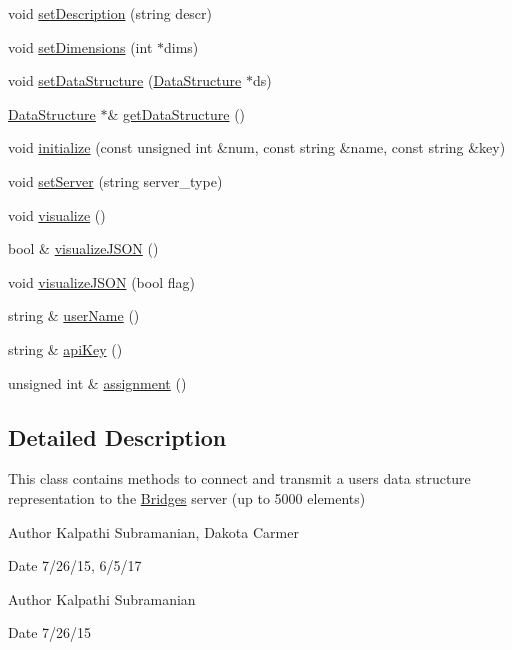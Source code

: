 \begin{DoxyCompactItemize}
void \hyperlink{namespacebridges_1_1_bridges_ada1bced1a3d7af3b8b139bbdfba72fc8}{set\+Description} (string descr)
\item 
void \hyperlink{namespacebridges_1_1_bridges_a0c04930dee803801d3a26c6ef70183f2}{set\+Dimensions} (int $\ast$dims)
\item 
void \hyperlink{namespacebridges_1_1_bridges_a7447e2d5808c492d26132690c1a639a7}{set\+Data\+Structure} (\hyperlink{classbridges_1_1_data_structure}{Data\+Structure} $\ast$ds)
\item 
\hyperlink{classbridges_1_1_data_structure}{Data\+Structure} $\ast$\& \hyperlink{namespacebridges_1_1_bridges_a7cee9c57a0cd6a213722ba0a81a742f0}{get\+Data\+Structure} ()
\item 
void \hyperlink{namespacebridges_1_1_bridges_a10272250ed6f4bb8281dcaecc61fa698}{initialize} (const unsigned int \&num, const string \&name, const string \&key)
\item 
void \hyperlink{namespacebridges_1_1_bridges_a569953bfdb1c2a29dbd0f7d6dee73606}{set\+Server} (string server\+\_\+type)
\item 
void \hyperlink{namespacebridges_1_1_bridges_a2806e395134614cdd6327400b53d28ad}{visualize} ()
\item 
bool \& \hyperlink{namespacebridges_1_1_bridges_a692124feb006d58c277db36c2e9342c8}{visualize\+J\+S\+O\+N} ()
\item 
void \hyperlink{namespacebridges_1_1_bridges_abb0f749a6dbcd0a430504f66de1dbe64}{visualize\+J\+S\+O\+N} (bool flag)
\item 
string \& \hyperlink{namespacebridges_1_1_bridges_a98c0c6658b8eb9e8f20a7f3119cbd984}{user\+Name} ()
\item 
string \& \hyperlink{namespacebridges_1_1_bridges_a4ec319d8c731624bd1aa0efa2427044e}{api\+Key} ()
\item 
unsigned int \& \hyperlink{namespacebridges_1_1_bridges_a97d6cfdc40ecead5d802ac2054933038}{assignment} ()
\end{DoxyCompactItemize}


\subsection{Detailed Description}
This class contains methods to connect and transmit a user\textquotesingle{}s data structure representation to the \hyperlink{namespacebridges_1_1_bridges}{Bridges} server (up to 5000 elements) 

\begin{DoxyAuthor}{Author}
Kalpathi Subramanian, Dakota Carmer 
\end{DoxyAuthor}
\begin{DoxyDate}{Date}
7/26/15, 6/5/17
\end{DoxyDate}
\begin{DoxyAuthor}{Author}
Kalpathi Subramanian 
\end{DoxyAuthor}
\begin{DoxyDate}{Date}
7/26/15 
\end{DoxyDate}


